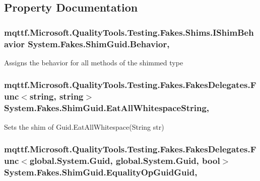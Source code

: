 \subsection{Property Documentation}
\hypertarget{class_system_1_1_fakes_1_1_shim_guid_aad68a6232be9d7515ea3d757688bb697}{
\subsubsection[{Behavior}]{\setlength{\rightskip}{0pt plus 5cm}mqttf.\-Microsoft.\-Quality\-Tools.\-Testing.\-Fakes.\-Shims.\-I\-Shim\-Behavior System.\-Fakes.\-Shim\-Guid.\-Behavior\hspace{0.3cm}{\ttfamily [static]}, {\ttfamily [set]}}}\label{class_system_1_1_fakes_1_1_shim_guid_aad68a6232be9d7515ea3d757688bb697}


Assigns the behavior for all methods of the shimmed type

\hypertarget{class_system_1_1_fakes_1_1_shim_guid_ad38ad5e2b183cbac68706a87e362815c}{
\subsubsection[{Eat\-All\-Whitespace\-String}]{\setlength{\rightskip}{0pt plus 5cm}mqttf.\-Microsoft.\-Quality\-Tools.\-Testing.\-Fakes.\-Fakes\-Delegates.\-Func$<$string, string$>$ System.\-Fakes.\-Shim\-Guid.\-Eat\-All\-Whitespace\-String\hspace{0.3cm}{\ttfamily [static]}, {\ttfamily [set]}}}\label{class_system_1_1_fakes_1_1_shim_guid_ad38ad5e2b183cbac68706a87e362815c}


Sets the shim of Guid.\-Eat\-All\-Whitespace(\-String str)

\hypertarget{class_system_1_1_fakes_1_1_shim_guid_a964dd0947efe8543306deeddaa44b9c5}{
\subsubsection[{Equality\-Op\-Guid\-Guid}]{\setlength{\rightskip}{0pt plus 5cm}mqttf.\-Microsoft.\-Quality\-Tools.\-Testing.\-Fakes.\-Fakes\-Delegates.\-Func$<$global.\-System.\-Guid, global.\-System.\-Guid, bool$>$ System.\-Fakes.\-Shim\-Guid.\-Equality\-Op\-Guid\-Guid\hspace{0.3cm}{\ttfamily [static]}, {\ttfamily [set]}}}\label{class_system_1_1_fakes_1_1_shim_guid_a964dd0947efe8543306deeddaa44b9c5}


